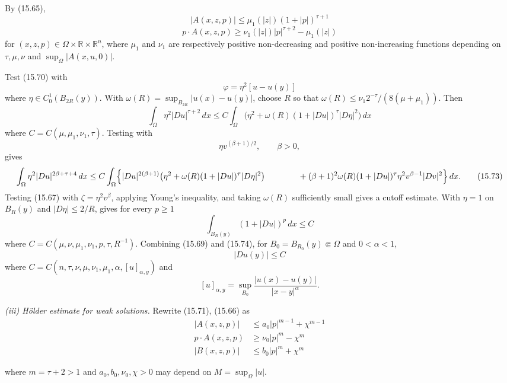 By (15.65),
\begin{equation}
|A(x,z,p)|\le \mu_1(|z|)(1+|p|)^{\tau+1}
\tag{15.71}
\end{equation}
\[
p\cdot A(x,z,p)\ge \nu_1(|z|)|p|^{\tau+2}-\mu_1(|z|)
\]
for $(x,z,p)\in \Omega\times \mathbb{R}\times \mathbb{R}^n$, where $\mu_1$ and $\nu_1$ are respectively positive non-decreasing and positive non-increasing functions depending on $\tau,\mu,\nu$ and $\sup_{\Omega}|A(x,u,0)|$.

Test (15.70) with
\[
\varphi=\eta^2[u-u(y)]
\]
where \(\eta\in C_0^1(B_{2R}(y))\). With
\(\omega(R)=\sup_{B_{2R}}|u(x)-u(y)|\), choose \(R\) so that
\(\omega(R)\le\nu_1 2^{-\tau}/(8(\mu+\mu_1))\).
Then
\[
\int_{\Omega} \eta^2 |Du|^{\tau+2}\,dx \leq C \int_{\Omega} \bigl(\eta^2+\omega(R)(1+|Du|)^{\tau}|D\eta|^2\bigr)\,dx
\tag{15.72}
\]
where \(C=C(\mu,\mu_1,\nu_1,\tau)\). Testing with
\[
\eta v^{(\beta+1)/2}, \qquad \beta>0,
\]
gives
\[
\int_{\Omega} \eta^2 |Du|^{2\beta+\tau+4}\,dx \leq C \int_{\Omega} \Bigl\{ |Du|^{2(\beta+1)}\bigl(\eta^2+\omega(R)(1+|Du|)^{\tau}|D\eta|^2\bigr)
\qquad\qquad +(\beta+1)^2\omega(R)(1+|Du|)^{\tau}\eta^2 v^{\beta-1}|Dv|^2 \Bigr\}\,dx.
\tag{15.73}
\]
Testing (15.67) with \(\zeta=\eta^2v^\beta\), applying Young's inequality,
and taking \(\omega(R)\) sufficiently small gives a cutoff estimate. With
\(\eta=1\) on \(B_R(y)\) and
\(|D\eta|\le2/R\), gives for every \(p\ge1\)
\begin{equation}\tag{15.74}
\int_{B_R(y)}(1+|Du|)^p\,dx\leq C
\end{equation}
where \(C=C(\mu,\nu,\mu_1,\nu_1,p,\tau,R^{-1})\). Combining (15.69) and
(15.74), for \(B_0=B_{R_0}(y)\Subset\Omega\) and \(0<\alpha<1\),
\begin{equation}\tag{15.75}
|Du(y)|\leq C
\end{equation}
where \(C=C(n,\tau,\nu,\mu,\nu_1,\mu_1,\alpha,[u]_{\alpha,y})\) and
\[
[u]_{\alpha,y}=\sup_{B_0}\frac{|u(x)-u(y)|}{|x-y|^\alpha}.
\]

\noindent\textit{(iii) H\"older estimate for weak solutions.}
Rewrite (15.71), (15.66) as
\begin{equation}\tag{15.76}
\begin{aligned}
|A(x,z,p)|&\leq a_0|p|^{m-1}+\chi^{m-1} \\
p\cdot A(x,z,p)&\geq \nu_0|p|^m-\chi^m \\
|B(x,z,p)|&\leq b_0|p|^m+\chi^m
\end{aligned}
\end{equation}


where \(m=\tau+2>1\) and \(a_0,b_0,\nu_0,\chi>0\) may depend on
\(M=\sup_\Omega|u|\).

